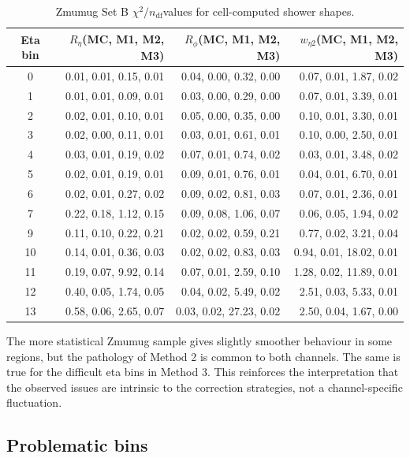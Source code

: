 \documentclass[11pt,a4paper]{article}
\newcommand{\Reta}{\ensuremath{R_{\eta}}}
\newcommand{\Rphi}{\ensuremath{R_{\phi}}}
\newcommand{\weta}{\ensuremath{w_{\eta 2}}}
\newcommand{\chisq}{\ensuremath{\chi^2 / n_{\mathrm{df}}}}
\begin{document}
\begin{table}[H]
\centering
\caption{Zmumug Set B \chisq values for cell-computed shower shapes.}
\label{tab:setB-zmumug}
\begin{tabular}{crrr}
\toprule
Eta bin & \Reta (MC, M1, M2, M3) & \Rphi (MC, M1, M2, M3) & \weta (MC, M1, M2, M3) \\
\midrule
0  & 0.01, 0.01, 0.15, 0.01 & 0.04, 0.00, 0.32, 0.00 & 0.07, 0.01, 1.87, 0.02 \\
1  & 0.01, 0.01, 0.09, 0.01 & 0.03, 0.00, 0.29, 0.00 & 0.07, 0.01, 3.39, 0.01 \\
2  & 0.02, 0.01, 0.10, 0.01 & 0.05, 0.00, 0.35, 0.00 & 0.10, 0.01, 3.30, 0.01 \\
3  & 0.02, 0.00, 0.11, 0.01 & 0.03, 0.01, 0.61, 0.01 & 0.10, 0.00, 2.50, 0.01 \\
4  & 0.03, 0.01, 0.19, 0.02 & 0.07, 0.01, 0.74, 0.02 & 0.03, 0.01, 3.48, 0.02 \\
5  & 0.02, 0.01, 0.19, 0.01 & 0.09, 0.01, 0.76, 0.01 & 0.04, 0.01, 6.70, 0.01 \\
6  & 0.02, 0.01, 0.27, 0.02 & 0.09, 0.02, 0.81, 0.03 & 0.07, 0.01, 2.36, 0.01 \\
7  & 0.22, 0.18, 1.12, 0.15 & 0.09, 0.08, 1.06, 0.07 & 0.06, 0.05, 1.94, 0.02 \\
9  & 0.11, 0.10, 0.22, 0.21 & 0.02, 0.02, 0.59, 0.21 & 0.77, 0.02, 3.21, 0.04 \\
10 & 0.14, 0.01, 0.36, 0.03 & 0.02, 0.02, 0.83, 0.03 & 0.94, 0.01, 18.02, 0.01 \\
11 & 0.19, 0.07, 9.92, 0.14 & 0.07, 0.01, 2.59, 0.10 & 1.28, 0.02, 11.89, 0.01 \\
12 & 0.40, 0.05, 1.74, 0.05 & 0.04, 0.02, 5.49, 0.02 & 2.51, 0.03, 5.33, 0.01 \\
13 & 0.58, 0.06, 2.65, 0.07 & 0.03, 0.02, 27.23, 0.02 & 2.50, 0.04, 1.67, 0.00 \\
\bottomrule
\end{tabular}
\end{table}

The more statistical Zmumug sample gives slightly smoother behaviour in some
regions, but the pathology of Method 2 is common to both channels. The same is
true for the difficult eta bins in Method 3. This reinforces the interpretation
that the observed issues are intrinsic to the correction strategies, not a
channel-specific fluctuation.

\subsection{Problematic bins}
\end{document}
